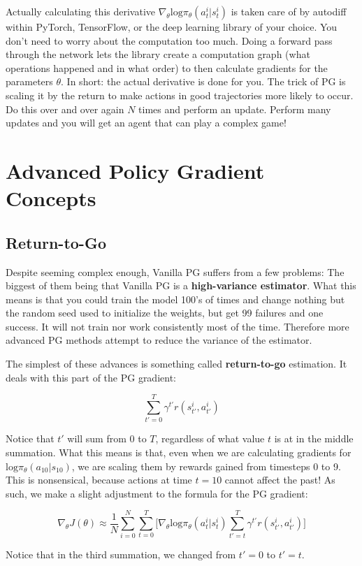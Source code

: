     Actually calculating this derivative $\nabla_\theta \mathrm{log}\pi_\theta(a_t^i|s_t^i)$ is taken care of by autodiff within PyTorch, TensorFlow, or the deep learning library of your choice. You don't need to worry about the computation too much. Doing a forward pass through the network lets the library create a computation graph (what operations happened and in what order) to then calculate gradients for the parameters $\theta$. In short: the actual derivative is done for you. The trick of PG is scaling it by the return to make actions in good trajectories more likely to occur. Do this over and over again $N$ times and perform an update. Perform many updates and you will get an agent that can play a complex game!
\section{Advanced Policy Gradient Concepts}
\subsection{Return-to-Go}
    \large Despite seeming complex enough, Vanilla PG suffers from a few problems: The biggest of them being that Vanilla PG is a \textbf{high-variance estimator}. What this means is that you could train the model 100's of times and change nothing but the random seed used to initialize the weights, but get 99 failures and one success. It will not train nor work consistently most of the time. Therefore more advanced PG methods attempt to reduce the variance of the estimator. 

    The simplest of these advances is something called \textbf{return-to-go} estimation. It deals with this part of the PG gradient:

    $$\sum_{t'=0}^T \gamma^{t'} r(s_{t'}^i, a_{t'}^i)$$

    Notice that $t'$ will sum from 0 to $T$, regardless of what value $t$ is at in the middle summation. What this means is that, even when we are calculating gradients for $\mathrm{log}\pi_\theta(a_10|s_10)$, we are scaling them by rewards gained from timesteps 0 to 9. This is nonsensical, because actions at time $t=10$ cannot affect the past! As such, we make a slight adjustment to the formula for the PG gradient:

    $$\nabla_\theta J(\theta) \approx \frac{1}{N}\sum_{i=0}^N\sum_{t=0}^T\biggl[ \nabla_\theta \mathrm{log}\pi_\theta(a_t^i|s_t^i)\sum_{t'=t}^T \gamma^{t'} r(s_{t'}^i, a_{t'}^i)\biggr]$$

    Notice that in the third summation, we changed from $t'=0$ to $t'=t$.
